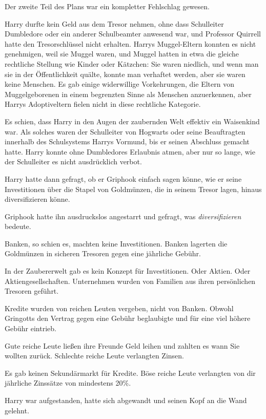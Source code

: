 Der zweite Teil des Plans war ein kompletter Fehlschlag gewesen.

Harry durfte kein Geld aus dem Tresor nehmen, ohne dass Schulleiter Dumbledore
oder ein anderer Schulbeamter anwesend war, und Professor Quirrell hatte den
Tresorschlüssel nicht erhalten. Harrys Muggel-Eltern konnten es nicht
genehmigen, weil sie Muggel waren, und Muggel hatten in etwa die gleiche
rechtliche Stellung wie Kinder oder Kätzchen: Sie waren niedlich, und wenn man
sie in der Öffentlichkeit quälte, konnte man verhaftet werden, aber sie waren
keine Menschen. Es gab einige widerwillige Vorkehrungen, die Eltern von
Muggelgeborenen in einem begrenzten Sinne als Menschen anzuerkennen, aber Harrys
Adoptiveltern fielen nicht in diese rechtliche Kategorie.

Es schien, dass Harry in den Augen der zaubernden Welt effektiv ein Waisenkind
war. Als solches waren der Schulleiter von Hogwarts oder seine Beauftragten
innerhalb des Schulsystems Harrys Vormund, bis er seinen Abschluss gemacht
hatte. Harry konnte ohne Dumbledores Erlaubnis atmen, aber nur so lange, wie der
Schulleiter es nicht ausdrücklich verbot.

Harry hatte dann gefragt, ob er Griphook einfach sagen könne, wie er seine
Investitionen über die Stapel von Goldmünzen, die in seinem Tresor lagen, hinaus
diversifizieren könne.

Griphook hatte ihn ausdruckslos angestarrt und gefragt, was
\glqq{}\emph{diversifizieren}\grqq{} bedeute.

Banken, so schien es, machten keine Investitionen. Banken lagerten die
Goldmünzen in sicheren Tresoren gegen eine jährliche Gebühr.

In der Zaubererwelt gab es kein Konzept für Investitionen. Oder Aktien. Oder
Aktiengesellschaften. Unternehmen wurden von Familien aus ihren persönlichen
Tresoren geführt.

Kredite wurden von reichen Leuten vergeben, nicht von Banken. Obwohl Gringotts
den Vertrag gegen eine Gebühr beglaubigte und für eine viel höhere Gebühr
eintrieb.

Gute reiche Leute ließen ihre Freunde Geld leihen und zahlten es wann Sie
wollten zurück. Schlechte reiche Leute verlangten Zinsen.

Es gab keinen Sekundärmarkt für Kredite. Böse reiche Leute verlangten von dir
jährliche Zinssätze von mindestens 20\%.

Harry war aufgestanden, hatte sich abgewandt und seinen Kopf an die Wand
gelehnt.

